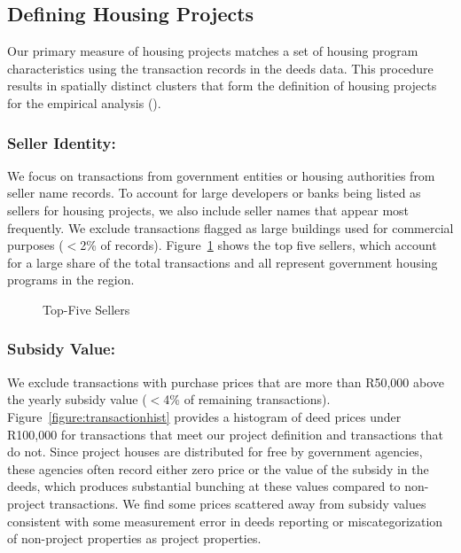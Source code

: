 \documentclass[12pt]{article}
\begin{document}
\subsection{Defining Housing Projects}

Our primary measure of housing projects matches a set of housing program characteristics using the transaction records in the deeds data.  This procedure results in spatially distinct clusters that form the definition of housing projects for the empirical analysis (\cite{serihistory}).

\subsubsection{Seller Identity:}
We focus on transactions from government entities or housing authorities from seller name records.  To account for large developers or banks being listed as sellers for housing projects, we also include seller names that appear most frequently.  We exclude transactions flagged as large buildings used for commercial purposes ($<$2\% of records).  Figure~\ref{figure:topfivesellers} shows the top five sellers, which account for a large share of the total transactions and all represent government housing programs in the region.  

\begin{figure}
\caption{Top-Five Sellers}\label{figure:topfivesellers}
\centering

\end{figure}


\subsubsection{Subsidy Value:}

We exclude transactions with purchase prices that are more than R50,000 above the yearly subsidy value ($<$4\% of remaining transactions).  Figure~\ref{figure:transactionhist} provides a histogram of deed prices under R100,000 for transactions that meet our project definition and transactions that do not.  Since project houses are distributed for free by government agencies, these agencies often record either zero price or the value of the subsidy in the deeds, which produces substantial bunching at these values compared to non-project transactions.  We find some prices scattered away from subsidy values consistent with some measurement error in deeds reporting or miscategorization of non-project properties as project properties.  
\end{document}
